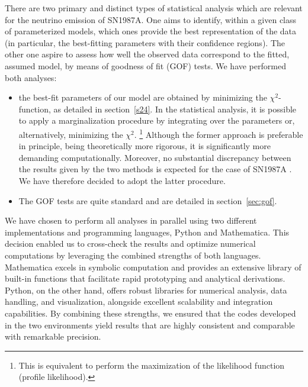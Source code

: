 \documentclass[a4paper,11pt]{article}
\begin{document}
There are two primary and distinct types of statistical analysis which are relevant
for the neutrino emission of SN1987A. One aims to identify, within a given class of parameterized models, which ones provide the best representation of the data (in particular, the best-fitting parameters with their confidence regions).  The other one aspire to assess how well  the observed data correspond to the fitted, assumed model,
by means of goodness of fit (GOF) tests.
%
We have performed both analyses:
\begin{itemize}
 \item[1]    
the best-fit parameters of our model are obtained by minimizing  the $\chi^2$-function, as  detailed in section~\ref{s24}. 
In the statistical analysis, it is possible to apply a marginalization procedure by integrating over the parameters \cite{Loredo:2001rx} or, alternatively,   minimizing the  $\chi^2$. \footnote{This is equivalent to perform the  maximization of the likelihood function \cite{Pagliaroli:2008ur} (profile likelihood).} Although the former approach is preferable in principle, being theoretically more rigorous, it is significantly more demanding computationally.
Moreover,   no substantial discrepancy between the results given by the two methods is expected for the case of SN1987A \cite{Pagliaroli:2008ur}. We have therefore decided to adopt the latter procedure. 
\item[2]  The GOF tests are  quite standard and are detailed  in section~\ref{sec:gof}. 
\end{itemize}


%
We have chosen to perform all analyses in parallel using two different implementations and programming languages, Python and Mathematica. This decision enabled us to cross-check the results and optimize numerical computations by leveraging the combined strengths of both languages. Mathematica excels in symbolic computation and provides an extensive library of built-in functions that facilitate rapid prototyping and analytical derivations. Python, on the other hand, offers robust libraries for numerical analysis, data handling, and visualization, alongside excellent scalability and integration capabilities. By combining these strengths, we ensured that the codes developed in the two environments yield results that are highly consistent and comparable with remarkable precision.
\end{document}
